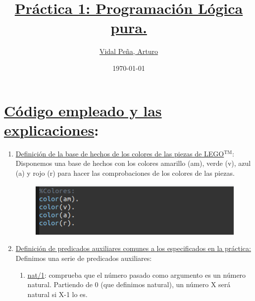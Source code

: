 \documentclass{article}
\title{\underline{\textbf{Práctica 1: Programación Lógica pura.}}}
\author{\authors\underline{Vidal Peña, Arturo}}
\date{\today}
\begin{document}
\maketitle

\quad

\quad

\quad

\quad

\quad

\quad

\tableofcontents

 \eject 

\section{\underline{Código empleado y las explicaciones}:}
\quad
\begin{enumerate}
\item  \underline{Definición de la base de hechos de los colores de las piezas de LEGO$\mathrm{{}^{TM}}$}:\\

 Disponemos una base de hechos con los colores amarillo (am), verde (v), azul (a) y rojo (r) para hacer las comprobaciones de los colores de las piezas.\newline
 
 \begin{figure}[h]
 	\centering
 	\includegraphics{images/baseColores.png}
 \end{figure}

\quad

\item  \underline{Definición de predicados auxiliares comunes a los especificados en la práctica:}\\
 

Definimos una serie de predicados auxiliares: \\

 \begin{enumerate}
\item  \underline{nat/1}: comprueba que el número pasado como argumento es un número natural. Partiendo de 0 (que definimos natural), un número X será natural si X-1 lo es.


\end{enumerate}
\end{enumerate}
\end{document}
